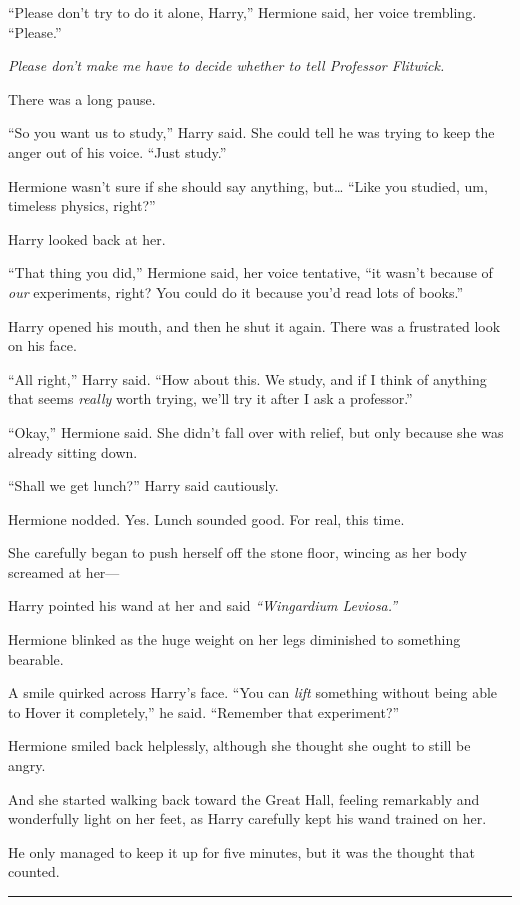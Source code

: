 ``Please don't try to do it alone, Harry,'' Hermione said, her voice
trembling. ``Please.''

\emph{Please don't make me have to decide whether to tell Professor
Flitwick.}

There was a long pause.

``So you want us to study,'' Harry said. She could tell he was trying to
keep the anger out of his voice. ``Just study.''

Hermione wasn't sure if she should say anything, but\ldots{} ``Like you
studied, um, timeless physics, right?''

Harry looked back at her.

``That thing you did,'' Hermione said, her voice tentative, ``it wasn't
because of \emph{our} experiments, right? You could do it because you'd
read lots of books.''

Harry opened his mouth, and then he shut it again. There was a
frustrated look on his face.

``All right,'' Harry said. ``How about this. We study, and if I think of
anything that seems \emph{really} worth trying, we'll try it after I ask
a professor.''

``Okay,'' Hermione said. She didn't fall over with relief, but only
because she was already sitting down.

``Shall we get lunch?'' Harry said cautiously.

Hermione nodded. Yes. Lunch sounded good. For real, this time.

She carefully began to push herself off the stone floor, wincing as her
body screamed at her---

Harry pointed his wand at her and said \emph{``Wingardium Leviosa.''}

Hermione blinked as the huge weight on her legs diminished to something
bearable.

A smile quirked across Harry's face. ``You can \emph{lift} something
without being able to Hover it completely,'' he said. ``Remember that
experiment?''

Hermione smiled back helplessly, although she thought she ought to still
be angry.

And she started walking back toward the Great Hall, feeling remarkably
and wonderfully light on her feet, as Harry carefully kept his wand
trained on her.

He only managed to keep it up for five minutes, but it was the thought
that counted.

\begin{center}\rule{3in}{0.4pt}\end{center}

